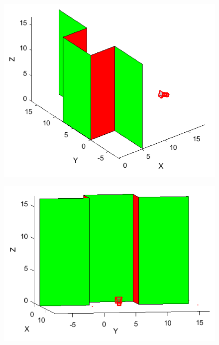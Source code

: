 \documentclass[11pt, oneside]{article}
\begin{document}
\begin{figure}[!h]
	\centering
	\begin{minipage}{.5\textwidth}
		\centering
		\includegraphics[scale = 0.65]{camera_localization_1.png}
		\label{camera_localization_1}
	\end{minipage}%
	\begin{minipage}{.5\textwidth}
		\centering
		\includegraphics[scale = 0.73]{camera_localization_2.png}
		\label{camera_localization_2}
	\end{minipage}
\end{figure}
\end{document}
